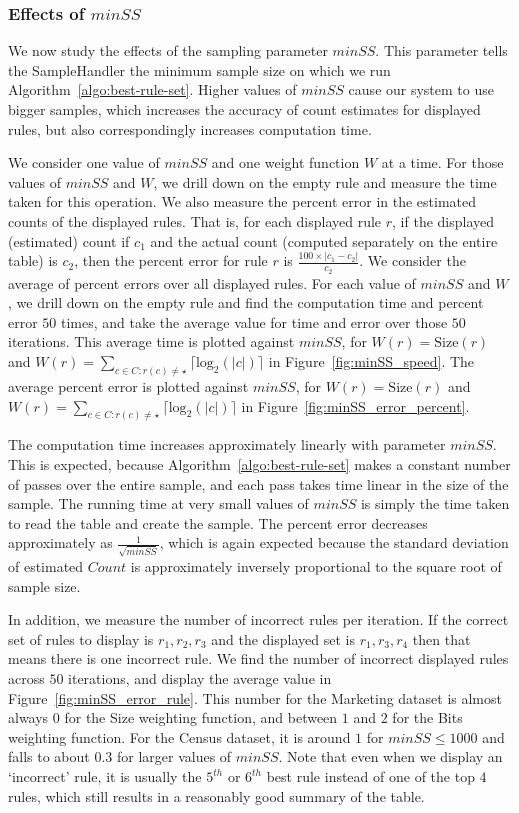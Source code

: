 \subsubsection{Effects of $minSS$}
We now study the effects of the sampling parameter $minSS$. This parameter tells the SampleHandler the minimum sample size on which we run Algorithm~\ref{algo:best-rule-set}.   Higher values of $minSS$ cause our system to use bigger samples, which increases the accuracy of count estimates for displayed rules, but also correspondingly increases computation time. 

We consider one value of $minSS$ and one weight function $W$ at a time. For those values of $minSS$ and $W$, we drill down on the empty rule and measure the time taken for this operation. We also measure the percent error in the estimated counts of the displayed rules. That is, for each displayed rule $r$, if the displayed (estimated) count if $c_1$ and the actual count (computed separately on the entire table) is $c_2$, then the percent error for rule $r$ is $\frac{100 \times |c_1-c_2|}{c_2}$. We consider the average of percent errors over all displayed rules. For each value of $minSS$ and $W$, we drill down on the empty rule and find the computation time and percent error $50$ times, and take the average value for time and error over those $50$ iterations. This average time is plotted against $minSS$, for $W(r) = \text{Size}(r)$ and $W(r) = \sum_{c \in C : r(c) \neq \star} \lceil \text{log}_2(|c|) \rceil$ in Figure~\ref{fig:minSS_speed}. The average percent error is plotted against $minSS$, for $W(r) = \text{Size}(r)$ and $W(r) = \sum_{c \in C : r(c) \neq \star} \lceil \text{log}_2(|c|) \rceil$ in Figure~\ref{fig:minSS_error_percent}. 

The computation time increases approximately linearly with parameter $minSS$. This is expected, because Algorithm~\ref{algo:best-rule-set} makes a constant number of passes over the entire sample, and each pass takes time linear in the size of the sample. The running time at very small values of $minSS$ is simply the time taken to read the table and create the sample. The percent error decreases approximately as $\frac{1}{\sqrt{minSS}}$, which is again expected because the standard deviation of estimated $Count$ is approximately inversely proportional to the square root of sample size.

In addition, we measure the number of incorrect rules per iteration. If the correct set of rules to display is $r_1, r_2, r_3$ and the displayed set is $r_1, r_3, r_4$ then that means there is one incorrect rule. We find the number of incorrect displayed rules across $50$ iterations, and display the average value in Figure~\ref{fig:minSS_error_rule}. This number for the Marketing dataset is almost always $0$ for the Size weighting function, and between $1$ and $2$ for the Bits weighting function. For the Census dataset, it is around $1$ for $minSS \leq 1000$ and falls to about $0.3$ for larger values of $minSS$. Note that even when we display an `incorrect' rule, it is usually the $5^{th}$ or $6^{th}$ best rule instead of one of the top $4$ rules, which still results in a reasonably good summary of the table.

